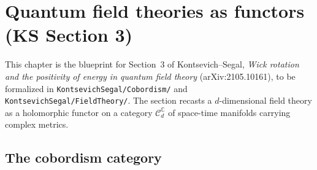 \chapter{Quantum field theories as functors (KS Section 3)}

This chapter is the blueprint for Section~3 of Kontsevich--Segal,
\emph{Wick rotation and the positivity of energy in quantum field theory}
(arXiv:2105.10161), to be formalized in \texttt{KontsevichSegal/Cobordism/}
and \texttt{KontsevichSegal/FieldTheory/}. The section recasts a
$d$-dimensional field theory as a holomorphic functor on a category
$\mathcal C_d^{\mathbb C}$ of space-time manifolds carrying complex metrics.

\section{The cobordism category}

